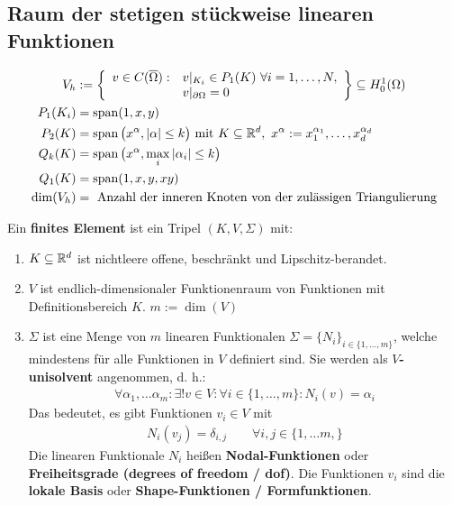 \subsection*{Raum der stetigen stückweise linearen Funktionen}
\begin{align*}
	V_h&:=\left\lbrace
	\begin{array}{rl}
		v\in C(\overline{\Omega}) : &v|_{K_i}\in P_1(K)~\forall i=1,\ldots,N,\\
		&v|_{\partial\Omega}=0
	\end{array}\right\rbrace
	\subseteq H^1_0(\Omega)\\
	P_1(K_i)&=\operatorname{span}(1,x,y)\\
	P_2(K)&=\operatorname{span}\big( x^\alpha, |\alpha|\leq k\big)\text{ mit } K\subseteq\mathbb{R}^d,~ x^{\alpha}:=x_1^{\alpha_1},\ldots,x_d^{\alpha_d}\\
	Q_k(K)&=\operatorname{span}\big(x^\alpha,\max\limits_i |\alpha_i|\leq k\big)\\
	Q_1(K)&=\operatorname{span}(1,x,y,xy)\\
	\dim(V_h)&=\text{ Anzahl der inneren Knoten von der zulässigen Triangulierung}\\
\end{align*}

\begin{definition}\enter %
	Ein \textbf{finites Element} ist ein Tripel $(K,V,\Sigma)$ mit:
	\begin{enumerate}[label=(\roman*)]
		\item $K\subseteq\mathbb{R}^d$ ist nichtleere offene, beschränkt und Lipschitz-berandet.
		\item $V$ ist endlich-dimensionaler Funktionenraum von Funktionen mit Definitionsbereich $K$. $m:=\dim(V)$
		\item $\Sigma$ ist eine Menge von $m$ linearen Funktionalen $\Sigma=\lbrace N_i\rbrace_{i\in\lbrace1,\ldots,m\rbrace}$, welche mindestens für alle 	 Funktionen in $V$ definiert sind.
		Sie werden als \textbf{$V$-unisolvent} angenommen, d. h.:
		\begin{align*}
			\forall \alpha_1,\ldots\alpha_m:\exists! v\in V:\forall i\in\lbrace1,\ldots,m\rbrace:N_i(v)=\alpha_i
		\end{align*}
		Das bedeutet, es gibt Funktionen $v_i\in V$ mit
		\begin{align*}
			N_i(v_j)=\delta_{i,j}\qquad\forall i,j\in\lbrace1,\ldots m,\rbrace
		\end{align*}
		Die linearen Funktionale $N_i$ heißen \textbf{Nodal-Funktionen} oder \textbf{Freiheitsgrade (degrees of freedom / dof)}. 
		Die Funktionen $v_i$ sind die \textbf{lokale Basis} oder \textbf{Shape-Funktionen / Formfunktionen}.
	\end{enumerate}
\end{definition}

